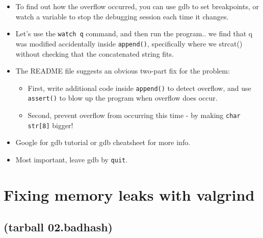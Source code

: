 \documentclass[aspectratio=169]{beamer}
\newcommand{\pitem}{\pause \item}
\begin{document}
\begin{frame}[fragile]
    \begin{itemize}
      \item
      To find out how the overflow occurred,
      you can use gdb to set breakpoints, or watch a variable to stop the
      debugging session each time it changes.

      \pitem
      Let's use the \verb+watch q+ command, and then run the program..
      \pause
      we find that q was modified accidentally inside \verb+append()+, specifically
      where we strcat() without checking that the concatenated string
      fits.

      \pitem
      The README file suggests an obvious two-part fix for the problem:
      \begin{itemize}
      \item
      First, write additional code inside \verb+append()+ to detect overflow, and
      use \verb+assert()+ to blow up the program when overflow does occur.
      \item
      Second, prevent overflow from occurring this time - by
      making \verb+char str[8]+ bigger!
      \end{itemize}

      \item
      Google for \alert{gdb tutorial} or \alert{gdb cheatsheet} for more info.

      \item
      Most important, leave gdb by \verb+quit+.
    \end{itemize}
\end{frame}

\section{Fixing memory leaks with valgrind}
\subsection{(tarball 02.badhash)}
\end{document}

